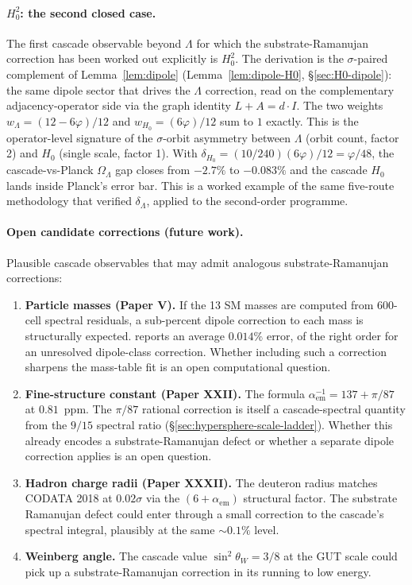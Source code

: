 \documentclass[11pt]{article}
\theoremstyle{plain}
\theoremstyle{definition}
\theoremstyle{remark}
\begin{document}
\paragraph{$H_0^2$: the second closed case.} The first cascade observable beyond $\Lambda$ for which the substrate-Ramanujan correction has been worked out explicitly is $H_0^2$. The derivation is the $\sigma$-paired complement of Lemma~\ref{lem:dipole} (Lemma~\ref{lem:dipole-H0}, \S\ref{sec:H0-dipole}): the same dipole sector that drives the $\Lambda$ correction, read on the complementary adjacency-operator side via the graph identity $L + A = d \cdot I$. The two weights $w_\Lambda = (12-6\varphi)/12$ and $w_{H_0} = (6\varphi)/12$ sum to $1$ exactly. This is the operator-level signature of the $\sigma$-orbit asymmetry between $\Lambda$ (orbit count, factor 2) and $H_0$ (single scale, factor 1). With $\delta_{H_0} = (10/240)(6\varphi)/12 = \varphi/48$, the cascade-vs-Planck $\Omega_\Lambda$ gap closes from $-2.7\%$ to $-0.083\%$ and the cascade $H_0$ lands inside Planck's error bar. This is a worked example of the same five-route methodology that verified $\delta_\Lambda$, applied to the second-order programme.

\paragraph{Open candidate corrections (future work).} Plausible cascade observables that may admit analogous substrate-Ramanujan corrections:
\begin{enumerate}[leftmargin=2em]
\item \textbf{Particle masses (Paper V).} If the 13 SM masses are computed from 600-cell spectral residuals, a sub-percent dipole correction to each mass is structurally expected. \citet{SmartV} reports an average $0.014\%$ error, of the right order for an unresolved dipole-class correction. Whether including such a correction sharpens the mass-table fit is an open computational question.
\item \textbf{Fine-structure constant (Paper XXII).} The formula $\alpha_\mathrm{em}^{-1} = 137 + \pi/87$ at $0.81$~ppm. The $\pi/87$ rational correction is itself a cascade-spectral quantity from the $9/15$ spectral ratio (\S\ref{sec:hypersphere-scale-ladder}). Whether this already encodes a substrate-Ramanujan defect or whether a separate dipole correction applies is an open question.
\item \textbf{Hadron charge radii (Paper XXXII).} The deuteron radius matches CODATA 2018 at $0.02\sigma$ via the $(6 + \alpha_\mathrm{em})$ structural factor. The substrate Ramanujan defect could enter through a small correction to the cascade's spectral integral, plausibly at the same $\sim 0.1\%$ level.
\item \textbf{Weinberg angle.} The cascade value $\sin^2\theta_W = 3/8$ at the GUT scale could pick up a substrate-Ramanujan correction in its running to low energy.
\end{enumerate}
\end{document}

